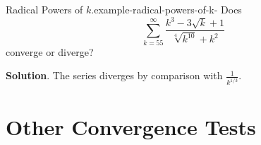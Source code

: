 \documentclass[10pt,]{book}
\numberwithin{equation}{section}
\begin{document}
\begin{example}{Radical Powers of \(k\).}{example-radical-powers-of-k-}%
\hypertarget{p-896}{}%
Does%
\begin{equation*}
\sum_{k=55}^{\infty}\frac{k^{3} - 3\sqrt{k} + 1}{\sqrt[4]{k^{10}} + k^{2}}
\end{equation*}
converge or diverge?%
\par\smallskip%
\noindent\textbf{Solution}.\hypertarget{solution-184}{}\quad%
\hypertarget{p-897}{}%
The series diverges by comparison with \(\frac{1}{k^{1/3}}\).%
\end{example}
%
%
\typeout{************************************************}
\typeout{************************************************}
%
\section[{Other Convergence Tests}]{Other Convergence Tests}\label{section-other-convergence-tests}
%
%
\typeout{************************************************}
\typeout{************************************************}
%
\end{document}
